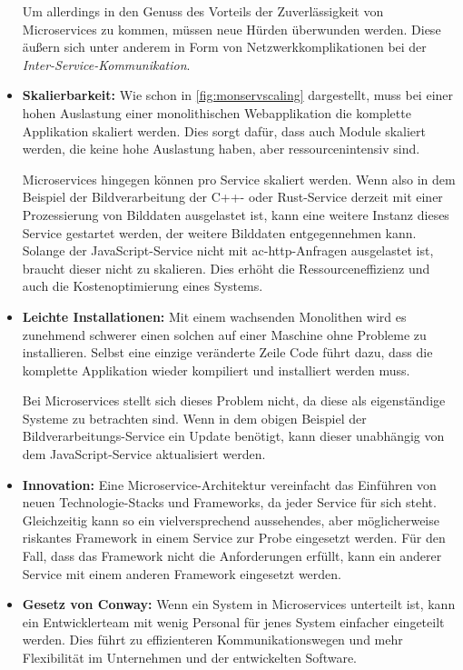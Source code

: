 \begin{itemize}
      Um allerdings in den Genuss des Vorteils der Zuverlässigkeit von Microservices zu kommen, müssen neue Hürden überwunden werden. Diese äußern sich unter anderem in Form von Netzwerkkomplikationen bei der \emph{Inter-Service-Kommunikation}.

      \item \textbf{Skalierbarkeit:} Wie schon in \autoref{fig:monservscaling} dargestellt, muss bei einer hohen Auslastung einer monolithischen Webapplikation die komplette Applikation skaliert werden. Dies sorgt dafür, dass auch Module skaliert werden, die keine hohe Auslastung haben, aber ressourcenintensiv sind.
      
      Microservices hingegen können pro Service skaliert werden. Wenn also in dem Beispiel der Bildverarbeitung der C++- oder Rust-Service derzeit mit einer Prozessierung von Bilddaten ausgelastet ist, kann eine weitere Instanz dieses Service gestartet werden, der weitere Bilddaten entgegennehmen kann. Solange der JavaScript-Service nicht mit \gls{ac-http}-Anfragen ausgelastet ist, braucht dieser nicht zu skalieren. Dies erhöht die Ressourceneffizienz und auch die Kostenoptimierung eines Systems.

      \item \textbf{Leichte Installationen:} Mit einem wachsenden Monolithen wird es zunehmend schwerer einen solchen auf einer Maschine ohne Probleme zu installieren. Selbst eine einzige veränderte Zeile Code führt dazu, dass die komplette Applikation wieder kompiliert und installiert werden muss.
      \clearpage

      Bei Microservices stellt sich dieses Problem nicht, da diese als eigenständige Systeme zu betrachten sind. Wenn in dem obigen Beispiel der Bildverarbeitungs-Service ein Update benötigt, kann dieser unabhängig von dem JavaScript-Service aktualisiert werden.

      \item \textbf{Innovation:} Eine Microservice-Architektur vereinfacht das Einführen von neuen Technologie-Stacks und Frameworks, da jeder Service für sich steht. Gleichzeitig kann so ein vielversprechend aussehendes, aber möglicherweise riskantes Framework in einem Service zur Probe eingesetzt werden. Für den Fall, dass das Framework nicht die Anforderungen erfüllt, kann ein anderer Service mit einem anderen Framework eingesetzt werden.
      
      \item \textbf{Gesetz von Conway:} Wenn ein System in Microservices unterteilt ist, kann ein Entwicklerteam mit wenig Personal für jenes System einfacher eingeteilt werden. Dies führt zu effizienteren Kommunikationswegen und mehr Flexibilität im Unternehmen und der entwickelten Software.
      

\end{itemize}
